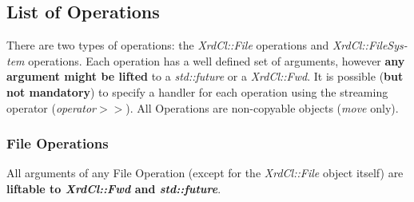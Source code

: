 \documentclass{article}
\begin{document}
	\subsection{List of Operations}
	
		There are two types of operations: the \textit{XrdCl::File} operations and \textit{XrdCl::FileSys-tem} operations. Each operation has a well defined
		set of arguments, however \textbf{any argument might be lifted} to a \textit{std::future} or a \textit{XrdCl::Fwd}. It is possible (\textbf{but not mandatory})
		to specify a handler for each operation using the streaming operator (\textit{operator$>$$>$}). All Operations are non-copyable
		objects (\textit{move} only).
		
		\subsubsection{File Operations}
		
			All arguments of any File Operation (except for the \textit{XrdCl::File} object itself) are \textbf{liftable to \textit{XrdCl::Fwd} and \textit{std::future}}.
			
\end{document}
